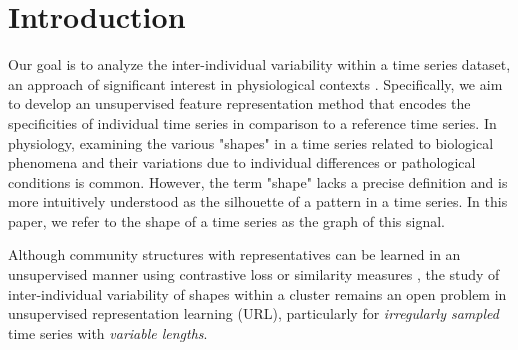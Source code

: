 

\section{Introduction}



Our goal is to analyze the inter-individual variability within a time series dataset, an approach of significant interest in physiological contexts \cite{guscelli2019importance, wang2016research, bar2012studying, germain2023unsupervised}.
 Specifically, we aim to develop an unsupervised feature representation method that encodes the specificities of individual time series in comparison to a reference time series.
In physiology, examining the various "shapes" in a time series related to biological phenomena and their variations due to individual differences or pathological conditions is common.
 However, the term "shape" lacks a precise definition and is more intuitively understood as the silhouette of a pattern in a time series. In this paper, we refer to the shape of a time series as the graph of this signal.

 Although community structures with representatives can be learned in an unsupervised manner \cite{trirat2024universal, meng2023unsupervised} using contrastive loss \cite{franceschi2019unsupervised, tonekaboni2021unsupervised, meng2023unsupervised} or similarity measures \cite{asgari2023clustering, germain2023unsupervised, paparrizos2015k, ye2009time},
  the study of inter-individual variability of shapes within a cluster \cite{niennattrakul2007inaccuracies, shirato2023identifying} remains an open problem in unsupervised representation learning (URL), particularly for \textit{irregularly sampled} time series with \textit{variable lengths}.
   
